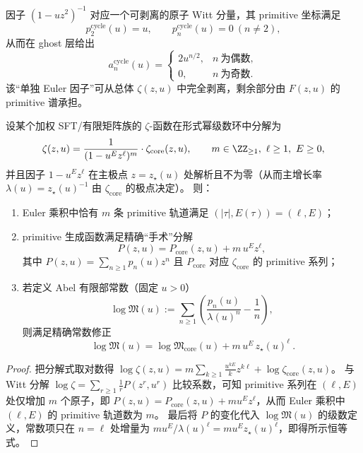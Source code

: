 \begin{remark}\label{rem:real-input-40-single-euler}
因子 $(1-uz^2)^{-1}$ 对应一个可剥离的原子 Witt 分量，其 primitive 坐标满足
\[
p^{\mathrm{cycle}}_2(u)=u,\qquad p^{\mathrm{cycle}}_n(u)=0\ (n\neq 2),
\]
从而在 ghost 层给出
\[
a^{\mathrm{cycle}}_n(u)=
\begin{cases}
2u^{n/2},& n\ \text{为偶数},\\
0,& n\ \text{为奇数}.
\end{cases}
\]
该“单独 Euler 因子”可从总体 $\zeta(z,u)$ 中完全剥离，剩余部分由 $F(z,u)$ 的 primitive 谱承担。
\end{remark}

\begin{proposition}\label{prop:primitive-orbit-surgery}
设某个加权 SFT/有限矩阵族的 \(\zeta\)-函数在形式幂级数环中分解为
\[
\zeta(z,u)=\frac{1}{(1-u^{E}z^{\ell})^{m}}\cdot \zeta_{\mathrm{core}}(z,u),
\qquad m\in\ZZ_{\ge 1},\ \ell\ge 1,\ E\ge 0,
\]
并且因子 \(1-u^{E}z^{\ell}\) 在主极点 \(z=z_\star(u)\) 处解析且不为零（从而主增长率 \(\lambda(u)=z_\star(u)^{-1}\) 由 \(\zeta_{\mathrm{core}}\) 的极点决定）。
则：
\begin{enumerate}
  \item Euler 乘积中恰有 \(m\) 条 primitive 轨道满足 \((|\tau|,E(\tau))=(\ell,E)\)；
  \item primitive 生成函数满足精确“手术”分解
  \[
  P(z,u)=P_{\mathrm{core}}(z,u)+m\,u^{E}z^{\ell},
  \]
  其中 \(P(z,u)=\sum_{n\ge 1}p_n(u)z^n\) 且 \(P_{\mathrm{core}}\) 对应 \(\zeta_{\mathrm{core}}\) 的 primitive 系列；
  \item 若定义 Abel 有限部常数（固定 \(u>0\)）
  \[
  \log\mathfrak{M}(u):=\sum_{n\ge 1}\left(\frac{p_n(u)}{\lambda(u)^n}-\frac{1}{n}\right),
  \]
  则满足精确常数修正
  \[
  \boxed{\ \log\mathfrak{M}(u)=\log\mathfrak{M}_{\mathrm{core}}(u)+m\,u^{E}\,z_\star(u)^{\ell}\ }.
  \]
\end{enumerate}
\end{proposition}
\begin{proof}
把分解式取对数得
\(
\log\zeta(z,u)=m\sum_{k\ge 1}\frac{u^{kE}}{k}z^{k\ell}+\log\zeta_{\mathrm{core}}(z,u)
\)。
与 Witt 分解 \(\log\zeta=\sum_{r\ge 1}\frac{1}{r}P(z^{r},u^{r})\) 比较系数，可知 primitive 系列在 \((\ell,E)\) 处仅增加 \(m\) 个原子，即
\(
P(z,u)=P_{\mathrm{core}}(z,u)+m u^{E}z^{\ell}
\)，从而 Euler 乘积中 \((\ell,E)\) 的 primitive 轨道数为 \(m\)。
最后将 \(P\) 的变化代入 \(\log\mathfrak{M}(u)\) 的级数定义，常数项只在 \(n=\ell\) 处增量为 \(m u^{E}/\lambda(u)^{\ell}=m u^{E}z_\star(u)^{\ell}\)，即得所示恒等式。
\end{proof}

